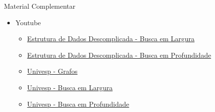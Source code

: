 \documentclass[aspectratio=169]{beamer}
\begin{document}
\begin{frame}{Material Complementar}
   \begin{itemize}
	\item Youtube
	\begin{itemize}
   \item \href{https://www.youtube.com/watch?v=jWoP1fTTDzE}{Estrutura de Dados Descomplicada - Busca em Largura}      
   \item \href{https://www.youtube.com/watch?v=pJ3ilnhXWCQ}{Estrutura de Dados Descomplicada - Busca em Profundidade}   	
   \item \href{https://www.youtube.com/watch?v=MC0u4f334mI}{Univesp - Grafos}   
   \item \href{https://www.youtube.com/watch?v=9J3Sz6K--8c}{Univesp - Busca em Largura}      
   \item \href{https://www.youtube.com/watch?v=doH9o1sO-Cw}{Univesp - Busca em Profundidade}         
	\end{itemize}		
   \end{itemize}
\end{frame}    

\end{document}
